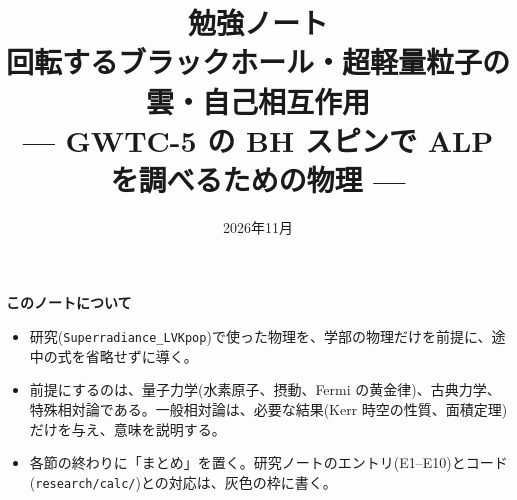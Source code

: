 \documentclass[a4paper,10pt]{ltjsarticle}
\title{勉強ノート\\回転するブラックホール・超軽量粒子の雲・自己相互作用\\{\large --- GWTC-5 の BH スピンで ALP を調べるための物理 ---}}
\author{}
\date{2026年11月}
\numberwithin{equation}{section}
\begin{document}
\maketitle
\vspace{-2em}

\begin{tcolorbox}[colback=white, colframe=ink2, boxrule=0.4pt, arc=2pt, left=6pt, right=6pt]
\small
\textbf{このノートについて}
\begin{itemize}
\item 研究(\texttt{Superradiance\_LVKpop})で使った物理を、学部の物理だけを前提に、途中の式を省略せずに導く。
\item 前提にするのは、量子力学(水素原子、摂動、Fermi の黄金律)、古典力学、特殊相対論である。一般相対論は、必要な結果(Kerr 時空の性質、面積定理)だけを与え、意味を説明する。
\item 各節の終わりに「まとめ」を置く。研究ノートのエントリ(E1--E10)とコード(\texttt{research/calc/})との対応は、灰色の枠に書く。
\end{itemize}
\end{tcolorbox}

\tableofcontents
\newpage











\appendix

\end{document}
